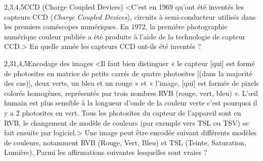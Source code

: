 \begin{quiz}[title={Photographie numérique}]
\begin{quizquestion*}[b]{1}{2,3,4,5}{CCD ({\upshape Charge Coupled Devices})}
<C'est en 1969 qu'ont été inventés les capteurs CCD (\textit{Charge Coupled Devices}), circuits à semi-conducteur utilisés dans les premiers caméscopes numériques. En 1972, la première photographie numérique couleur publiée a été produite à l'aide de la technologie de capteur CCD.>
En quelle année les capteurs CCD ont-ils été inventés ?
\end{quizquestion*}

\begin{quizquestion}[b]{2,3}{1,4,5}{Encodage des images}
<Il faut bien distinguer « le capteur [qui] est formé de photosites en matrice de petits carrés de quatre photosites [(dans la majorité des cas)], deux verts, un bleu et un rouge » et « l’image, [qui] est formée de pixels colorés homogènes, représentés par trois nombres RVB (rouge, vert, bleu) ».
L’œil humain est plus sensible à la longueur d'onde de la couleur verte c'est pourquoi il y a 2 photosites en vert.
Tous les photosites du capteur de l'appareil sont en RVB, le changement de modèle de couleurs (par exemple vers TSL ou TSV) se fait ensuite par logiciel.>
Une image peut être encodée suivant différents modèles de couleurs, notamment RVB (Rouge, Vert, Bleu) et TSL (Teinte, Saturation, Lumière). Parmi les affirmations suivantes lesquelles sont vraies ?
\end{quizquestion}


\end{quiz}
